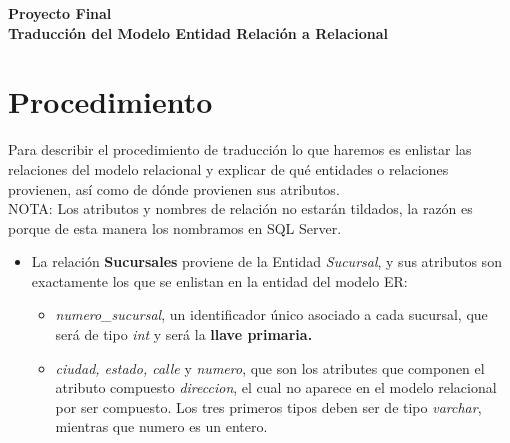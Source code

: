 \documentclass[11pt]{article}
\begin{document}
\begin{center}
	\LARGE{\textbf{Proyecto Final\\Traducción del Modelo Entidad Relación a Relacional}}
\end{center}

\section*{Procedimiento}
Para describir el procedimiento de traducción lo que haremos es enlistar las relaciones del modelo relacional y explicar de qué entidades o relaciones provienen, así como de dónde provienen sus atributos.\\
NOTA: Los atributos y nombres de relación no estarán tildados, la razón es porque de esta manera los nombramos en SQL Server.
\begin{itemize}

\item La relación \textbf{Sucursales} proviene de la Entidad \textit{Sucursal}, y sus atributos son exactamente los que se enlistan en la entidad del modelo ER:
    \begin{itemize}
    \item \textit{numero\_sucursal}, un identificador único asociado a cada sucursal, que será de tipo \textit{int} y será la \textbf{llave primaria.}
    \item \textit{ciudad, estado, calle} y \textit{numero}, que son los atributes que componen el atributo compuesto \textit{direccion}, el cual no aparece en el modelo relacional por ser compuesto. Los tres primeros tipos deben ser de tipo \textit{varchar}, mientras que numero es un entero. 
    \end{itemize}


\end{itemize}
\end{document}
